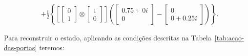 \begin{equation}
\begin{split}
                &+\frac{1}{2} \left\{ \left[ \begin{bmatrix} 0 \\ 1 \end{bmatrix} \otimes
                  \begin{bmatrix} 1 \\ 0 \end{bmatrix}\right] \left( \begin{bmatrix} {0.75+0i} \\ 0 \end{bmatrix} -
                  \begin{bmatrix} 0 \\ {0+0.25i} \end{bmatrix}\right) \right\}.
  \end{split}
\end{equation}

Para reconstruir o estado, aplicando as condições descritas na Tabela~\ref{tab:acao-das-portas} teremos:

